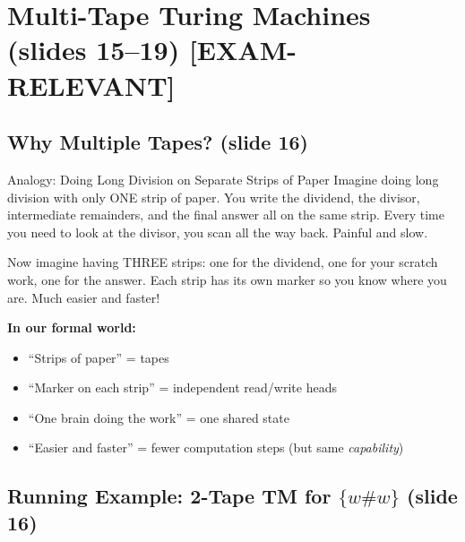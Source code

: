 \documentclass[11pt,a4paper]{article}
\newcommand{\kemark}{\textcolor{red!70!black}{\textbf{[EXAM-RELEVANT]}}}
\begin{document}
\section{Multi-Tape Turing Machines (slides 15--19) \kemark}

\subsection{Why Multiple Tapes? (slide 16)}

\begin{notebox}{Analogy: Doing Long Division on Separate Strips of Paper}
Imagine doing long division with only ONE strip of paper. You write the dividend, the divisor, intermediate remainders, and the final answer all on the same strip. Every time you need to look at the divisor, you scan all the way back. Painful and slow.

Now imagine having THREE strips: one for the dividend, one for your scratch work, one for the answer. Each strip has its own marker so you know where you are. Much easier and faster!

\textbf{In our formal world:}
\begin{itemize}[nosep]
\item ``Strips of paper'' = tapes
\item ``Marker on each strip'' = independent read/write heads
\item ``One brain doing the work'' = one shared state
\item ``Easier and faster'' = fewer computation steps (but same \textit{capability})
\end{itemize}
\end{notebox}

\subsection{Running Example: 2-Tape TM for $\{w\#w\}$ (slide 16)}
\end{document}
